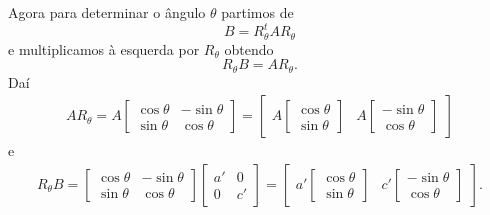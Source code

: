 Agora para determinar o ângulo $\theta$ partimos de
\[
    B = R_\theta^t A R_\theta
\]
e multiplicamos à esquerda por $R_\theta$ obtendo
\[
    R_\theta B = AR_\theta.
\]
Daí
\begin{align*}
    AR_\theta = A \begin{bmatrix}
                      \cos\theta & -\sin\theta \\
                      \sin\theta & \cos\theta
                  \end{bmatrix} = \begin{bmatrix}
                                      A \begin{bmatrix}
              \cos\theta \\ \sin\theta
          \end{bmatrix} & A \begin{bmatrix}
                                -\sin\theta \\ \cos\theta
                            \end{bmatrix}
                                  \end{bmatrix}
\end{align*}
e
\begin{align*}
    R_\theta B = \begin{bmatrix}
                     \cos\theta & -\sin\theta \\
                     \sin\theta & \cos\theta
                 \end{bmatrix} \begin{bmatrix}
                                   a' & 0  \\
                                   0  & c'
                               \end{bmatrix} = \begin{bmatrix}
                                                   a' \begin{bmatrix}
               \cos\theta \\ \sin\theta
           \end{bmatrix} & c' \begin{bmatrix}
                                  -\sin\theta \\ \cos\theta
                              \end{bmatrix}
                                               \end{bmatrix}.
\end{align*}


